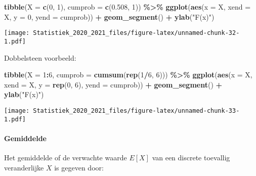 \documentclass[
  12pt,dutch,coursenotes]{book}
\newenvironment{Shaded}{\begin{snugshade}}{\end{snugshade}}
\newcommand{\DataTypeTok}[1]{\textcolor[rgb]{0.13,0.29,0.53}{#1}}
\newcommand{\DecValTok}[1]{\textcolor[rgb]{0.00,0.00,0.81}{#1}}
\newcommand{\FloatTok}[1]{\textcolor[rgb]{0.00,0.00,0.81}{#1}}
\newcommand{\KeywordTok}[1]{\textcolor[rgb]{0.13,0.29,0.53}{\textbf{#1}}}
\newcommand{\NormalTok}[1]{#1}
\newcommand{\OperatorTok}[1]{\textcolor[rgb]{0.81,0.36,0.00}{\textbf{#1}}}
\newcommand{\StringTok}[1]{\textcolor[rgb]{0.31,0.60,0.02}{#1}}
\theoremstyle{definition}
\theoremstyle{definition}
\theoremstyle{definition}
\theoremstyle{remark}
\begin{document}
\begin{Shaded}
\begin{Highlighting}[]
\KeywordTok{tibble}\NormalTok{(}\DataTypeTok{X =} \KeywordTok{c}\NormalTok{(}\DecValTok{0}\NormalTok{, }\DecValTok{1}\NormalTok{), }\DataTypeTok{cumprob =} \KeywordTok{c}\NormalTok{(}\FloatTok{0.508}\NormalTok{, }\DecValTok{1}\NormalTok{)) }\OperatorTok{\%\textgreater{}\%}\StringTok{ }\KeywordTok{ggplot}\NormalTok{(}\KeywordTok{aes}\NormalTok{(}\DataTypeTok{x =}\NormalTok{ X, }
    \DataTypeTok{xend =}\NormalTok{ X, }\DataTypeTok{y =} \DecValTok{0}\NormalTok{, }\DataTypeTok{yend =}\NormalTok{ cumprob)) }\OperatorTok{+}\StringTok{ }\KeywordTok{geom\_segment}\NormalTok{() }\OperatorTok{+}\StringTok{ }
\StringTok{    }\KeywordTok{ylab}\NormalTok{(}\StringTok{"F(x)"}\NormalTok{)}
\end{Highlighting}
\end{Shaded}

\texttt{[image: Statistiek\_2020\_2021\_files/figure-latex/unnamed-chunk-32-1.pdf]}

Dobbelsteen voorbeeld:

\begin{Shaded}
\begin{Highlighting}[]
\KeywordTok{tibble}\NormalTok{(}\DataTypeTok{X =} \DecValTok{1}\OperatorTok{:}\DecValTok{6}\NormalTok{, }\DataTypeTok{cumprob =} \KeywordTok{cumsum}\NormalTok{(}\KeywordTok{rep}\NormalTok{(}\DecValTok{1}\OperatorTok{/}\DecValTok{6}\NormalTok{, }\DecValTok{6}\NormalTok{))) }\OperatorTok{\%\textgreater{}\%}\StringTok{ }
\StringTok{    }\KeywordTok{ggplot}\NormalTok{(}\KeywordTok{aes}\NormalTok{(}\DataTypeTok{x =}\NormalTok{ X, }\DataTypeTok{xend =}\NormalTok{ X, }\DataTypeTok{y =} \KeywordTok{rep}\NormalTok{(}\DecValTok{0}\NormalTok{, }\DecValTok{6}\NormalTok{), }\DataTypeTok{yend =}\NormalTok{ cumprob)) }\OperatorTok{+}\StringTok{ }
\StringTok{    }\KeywordTok{geom\_segment}\NormalTok{() }\OperatorTok{+}\StringTok{ }\KeywordTok{ylab}\NormalTok{(}\StringTok{"F(x)"}\NormalTok{)}
\end{Highlighting}
\end{Shaded}

\texttt{[image: Statistiek\_2020\_2021\_files/figure-latex/unnamed-chunk-33-1.pdf]}

\hypertarget{gemiddelde}{%
\paragraph{Gemiddelde}\label{gemiddelde}}

Het gemiddelde of de verwachte waarde \(E[X]\) van een discrete toevallig veranderlijke \(X\) is gegeven door:
\end{document}
